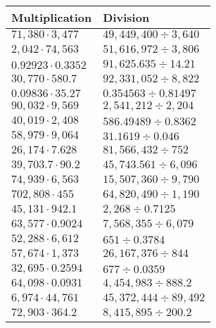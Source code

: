 \begin{longtable}[]{@{}ll@{}}
\toprule
Multiplication & Division\tabularnewline
\midrule
\endhead
\(71,380\cdot3,477\) & \(49,449,400÷3,640\)\tabularnewline
\(2,042\cdot74,563\) & \(51,616,972÷3,806\)\tabularnewline
\(0.92923\cdot0.3352\) & \(91,625.635÷14.21\)\tabularnewline
\(30,770\cdot580.7\) & \(92,331,052÷8,822\)\tabularnewline
\(0.09836\cdot35.27\) & \(0.354563÷0.81497\)\tabularnewline
\(90,032\cdot9,569\) & \(2,541,212÷2,204\)\tabularnewline
\(40,019\cdot2,408\) & \(586.49489÷0.8362\)\tabularnewline
\(58,979\cdot9,064\) & \(31.1619 ÷0.046\)\tabularnewline
\(26,174\cdot7.628\) & \(81,566,432÷752\)\tabularnewline
\(39,703.7\cdot90.2\) & \(45,743.561÷6,096\)\tabularnewline
\(74,939\cdot6,563\) & \(15,507,360÷9,790\)\tabularnewline
\(702,808\cdot455\) & \(64,820,490÷1,190\)\tabularnewline
\(45,131\cdot942.1\) & \(2,268÷0.7125\)\tabularnewline
\(63,577\cdot0.9024\) & \(7,568,355÷6,079\)\tabularnewline
\(52,288\cdot6,612\) & \(651÷0.3784\)\tabularnewline
\(57,674\cdot1,373\) & \(26,167,376÷844\)\tabularnewline
\(32,695\cdot0.2594\) & \(677÷0.0359\)\tabularnewline
\(64,098\cdot0.0931\) & \(4,454,983÷888.2\)\tabularnewline
\(6,974\cdot44,761\) & \(45,372,444÷89,492\)\tabularnewline
\(72,903\cdot364.2\) & \(8,415,895÷200.2\)\tabularnewline
\bottomrule
\end{longtable}
